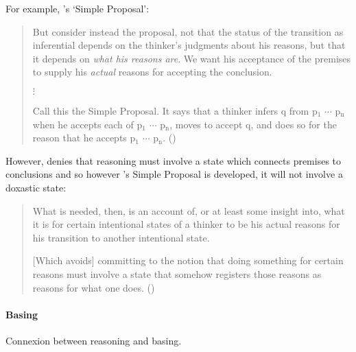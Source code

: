 \begin{note}
  For example, \citeauthor{Wright:2014tt}'s `Simple Proposal':
  \begin{quote}
    But consider instead the proposal, not that the status of the transition as inferential depends on the thinker's judgments about his reasons, but that it depends on \emph{what his reasons are}.
    We want his acceptance of the premises to supply his \emph{actual} reasons for accepting the conclusion.

    \mbox{}\hfill\(\vdots\)\hfill\mbox{}

    Call this the Simple Proposal.
    It says that a thinker infers q from p\(_{1}\) \(\cdots\) p\(_{\text{n}}\) when he accepts each of p\(_{1}\) \(\cdots\) p\(_{\text{n}}\), moves to accept q, and does so for the reason that he accepts p\(_{1}\) \(\cdots\) p\(_{\text{n}}\).\newline
      \mbox{}\hfill\mbox{(\Citeyear[33]{Wright:2014tt})}
    \end{quote}

    However, \citeauthor{Wright:2014tt} denies that reasoning must involve a state which connects premises to conclusions and so however \citeauthor{Wright:2014tt}'s Simple Proposal is developed, it will not involve a doxastic state:

    \begin{quote}
      What is needed, then, is an account of, or at least some insight into, what it is for certain intentional states of a thinker to be his actual reasons for his transition to another intentional state.

      [Which avoids] committing to the notion that doing something for certain reasons must involve a state that somehow registers those reasons as reasons for what one does.%
      \mbox{}\hfill\mbox{(\Citeyear[34]{Wright:2014tt})}
    \end{quote}
\end{note}

\paragraph*{Basing}

\begin{note}
  Connexion between reasoning and basing.
\end{note}

